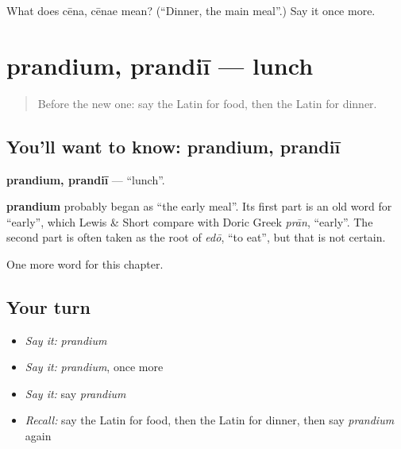 \begin{tcolorbox}[breakable,colback=teal!4,colframe=teal!35!black,title={Before you move on}]
What does cēna, cēnae mean? (\textquotedblleft{}Dinner, the main meal\textquotedblright{}.) Say it once more.
\end{tcolorbox}
\section[prandium, prandiī]{prandium, prandiī — lunch}

\label{lesson:LA-C79-prandium}



\begin{quote}
Before the new one: say the Latin for food, then the Latin for dinner.
\end{quote}

\subsection*{You'll want to know: prandium, prandiī}
\textbf{prandium, prandiī} — \textquotedblleft{}lunch\textquotedblright{}.

\begin{cousinweb}
\textbf{prandium} probably began as \textquotedblleft{}the early meal\textquotedblright{}. Its first part is an old word for \textquotedblleft{}early\textquotedblright{}, which Lewis \& Short compare with Doric Greek \emph{prān}, \textquotedblleft{}early\textquotedblright{}. The second part is often taken as the root of \emph{edō}, \textquotedblleft{}to eat\textquotedblright{}, but that is not certain.
\end{cousinweb}

\begin{grammarlens}[title={What you've built}]
One more word for this chapter.
\end{grammarlens}

\subsection*{Your turn}
\begin{itemize}
\raggedright
  \item \emph{Say it:} \emph{prandium}
  \item \emph{Say it:} \emph{prandium}, once more
  \item \emph{Say it:} say \emph{prandium}
  \item \emph{Recall:} say the Latin for food, then the Latin for dinner, then say \emph{prandium} again
\end{itemize}

